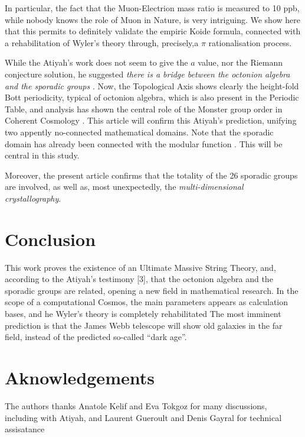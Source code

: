 \documentclass[preprint,12pt]{elsarticle}
\begin{document}
   In particular, the fact that the Muon-Electrion mass ratio is measured to 10 ppb, while nobody knows the role of Muon in Nature, is very intriguing. We show here that this permits to definitely validate the empiric Koide formula, connected with a rehabilitation of Wyler's theory through, precisely,a $\pi$ rationalisation process. 
   
   While the Atiyah's work does not seem to give the $a$ value, nor the Riemann conjecture solution, he suggested \textit{there is a bridge between the octonion algebra and the sporadic groups} \cite{Atiyah1}. Now, the Topological Axis shows clearly the height-fold Bott periodicity, typical of octonion algebra, which is also present in the Periodic Table, and analysis has shown the central role of the Monster group order in Coherent Cosmology \cite{Sanchez}. This article will confirm this Atiyah's prediction, unifying two appently no-connected mathematical domains. Note that the sporadic domain has already been connected with the modular function \cite{Conway} \cite{Borcherds}. This will be central in this study.
       
     Moreover, the present article confirms that the totality of the 26 sporadic groups are involved, as well as, most unexpectedly, the \textit{multi-dimensional crystallography}. 




\section{Conclusion}

This work proves the existence of an Ultimate Massive String Theory, and, according to the Atiyah's testimony [3], that the octonion algebra and the sporadic groups are related, opening a new field in mathematical research. In the scope of a computational Cosmos, the main parameters appears as calculation bases, and he Wyler's theory is completely rehabilitated  The most imminent prediction is that the James Webb telescope will show old galaxies in the far field, instead of the predicted so-called ``dark age''.

\section {Aknowledgements}

The authors thanks Anatole Kelif and Eva Tokgoz for many discussions, including with Atiyah, and Laurent Gueroult and Denis Gayral for technical assisatance
\end{document}
